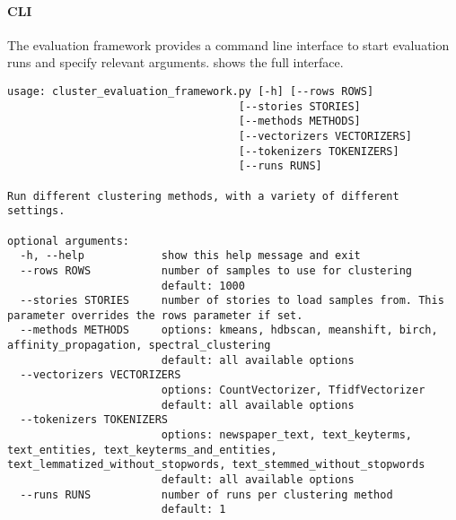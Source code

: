 \paragraph{CLI}
The evaluation framework provides a command line interface to start evaluation runs and specify relevant arguments.
 shows the full interface.

\begin{lstlisting}[caption=Command line interface for the evaluation framework., label={lst:cluster_evaluation_framework}]
usage: cluster_evaluation_framework.py [-h] [--rows ROWS] 
                                    [--stories STORIES]
                                    [--methods METHODS]
                                    [--vectorizers VECTORIZERS]
                                    [--tokenizers TOKENIZERS] 
                                    [--runs RUNS]

Run different clustering methods, with a variety of different settings.

optional arguments:
  -h, --help            show this help message and exit
  --rows ROWS           number of samples to use for clustering 
                        default: 1000
  --stories STORIES     number of stories to load samples from. This parameter overrides the rows parameter if set.
  --methods METHODS     options: kmeans, hdbscan, meanshift, birch, affinity_propagation, spectral_clustering 
                        default: all available options
  --vectorizers VECTORIZERS
                        options: CountVectorizer, TfidfVectorizer 
                        default: all available options
  --tokenizers TOKENIZERS
                        options: newspaper_text, text_keyterms, text_entities, text_keyterms_and_entities, text_lemmatized_without_stopwords, text_stemmed_without_stopwords 
                        default: all available options
  --runs RUNS           number of runs per clustering method 
                        default: 1
\end{lstlisting}